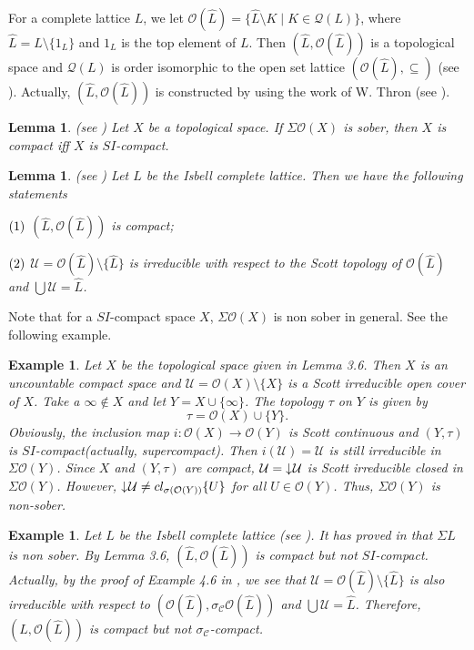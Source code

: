 \documentclass[preprint,12pt]{elsarticle}
\numberwithin{equation}{section}
\newtheorem{lemma}[theorem]{Lemma}
\newtheorem{example}[theorem]{Example}
\newcommand{\dn}{\mathord{\downarrow}\hspace{0.05em}}
\begin{document}
\quad For a complete lattice $L$, we let $\mathcal{O}(\hat{L})=\{\hat{L}\setminus K \mid K\in\mathcal{Q}(L)\}$, where $\hat{L}=L\setminus\{1_{L}\}$ and $1_L$ is the top element of $L$. Then $(\hat{L},\mathcal{O}(\hat{L}))$ is a topological space and $\mathcal{Q}(L)$ is order isomorphic to the open set lattice $(\mathcal{O}(\hat{L}),\subseteq)$ (see \cite{BZ35}). Actually, $(\hat{L},\mathcal{O}(\hat{L}))$ is constructed by using the work of W. Thron (see \cite{ARU175}).

\begin{lemma} (see \cite{BZ35}) Let $X$ be a topological space. If $\Sigma\mathcal{O}(X)$ is sober, then $X$ is compact iff $X$ is $SI$-compact.

\end{lemma}

\begin{lemma}(see \cite{BZ35}) Let $L$ be the Isbell complete lattice. Then we have the following statements

${\rm(1)}$ $(\hat{L},\mathcal{O}(\hat{L}))$ is compact;


${\rm(2)}$ $\mathcal{U}=\mathcal{O}(\hat{L})\setminus\{\hat{L}\}$ is irreducible with respect to the Scott topology of $\mathcal{O}(\hat{L})$ and $\bigcup\mathcal{U}=\hat{L}$.

\end{lemma}


\quad Note that for a $SI$-compact space $X$, $\Sigma\mathcal{O}(X)$ is non sober in general. See the following example.

\begin{example} {\rm Let $X$ be the topological space given in Lemma 3.6. Then $X$ is an uncountable compact space and $\mathcal{U}=\mathcal{O}(X)\setminus\{X\}$ is a Scott irreducible open cover of $X$. Take a $\infty\not\in X$ and let $Y=X\cup\{\infty\}$. The topology $\tau$ on $Y$ is given by
$$\tau=\mathcal{O}(X)\cup\{Y\}.$$
Obviously, the inclusion map $i:\mathcal{O}(X)\longrightarrow\mathcal{O}(Y)$ is Scott continuous and $(Y,\tau)$ is $SI$-compact(actually, supercompact). Then $i(\mathcal{U})=\mathcal{U}$ is still irreducible in $\Sigma\mathcal{O}(Y)$. Since $X$ and $(Y,\tau)$ are compact, $\mathcal{U}=\dn\mathcal{U}$ is Scott irreducible closed in $\Sigma\mathcal{O}(Y)$. However, $\dn\mathcal{U}\neq cl_{\sigma(\mathcal{O}(Y))}\{U\}$ for all $U\in\mathcal{O}(Y)$. Thus, $\Sigma \mathcal{O}(Y)$ is non-sober.

}
\end{example}

\begin{example}{\rm Let $L$ be the Isbell complete lattice (see \cite{IJ82}). It has proved in \cite{IJ82} that $\Sigma L$ is non sober. By Lemma 3.6, $(\hat{L},\mathcal{O}(\hat{L}))$ is compact but not $SI$-compact. Actually, by the proof of Example 4.6 in \cite{BZ35}, we see that $\mathcal{U}=\mathcal{O}(\hat{L})\setminus\{\hat{L}\}$ is also irreducible with respect to $(\mathcal{O}(\hat{L}),\sigma_{\mathcal{C}}\mathcal{O}(\hat{L}))$ and $\bigcup\mathcal{U}=\hat{L}$. Therefore, $(\hat{L},\mathcal{O}(\hat{L}))$ is compact but not $\sigma_{\mathcal{C}}$-compact.}
\end{example}
\end{document}
